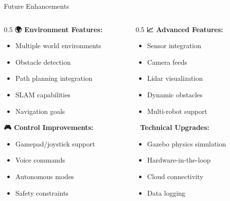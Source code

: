 \documentclass[aspectratio=169]{beamer}
\begin{document}
\begin{frame}{Future Enhancements}
\begin{columns}
\begin{column}{0.5\textwidth}
\textbf{🌍 Environment Features:}
\begin{itemize}
    \item Multiple world environments
    \item Obstacle detection
    \item Path planning integration
    \item SLAM capabilities
    \item Navigation goals
\end{itemize}

\textbf{🎮 Control Improvements:}
\begin{itemize}
    \item Gamepad/joystick support
    \item Voice commands
    \item Autonomous modes
    \item Safety constraints
\end{itemize}
\end{column}

\begin{column}{0.5\textwidth}
\textbf{📈 Advanced Features:}
\begin{itemize}
    \item Sensor integration
    \item Camera feeds
    \item Lidar visualization
    \item Dynamic obstacles
    \item Multi-robot support
\end{itemize}

\textbf{🔧 Technical Upgrades:}
\begin{itemize}
    \item Gazebo physics simulation
    \item Hardware-in-the-loop
    \item Cloud connectivity
    \item Data logging
\end{itemize}
\end{column}
\end{columns}
\end{frame}
\end{document}

